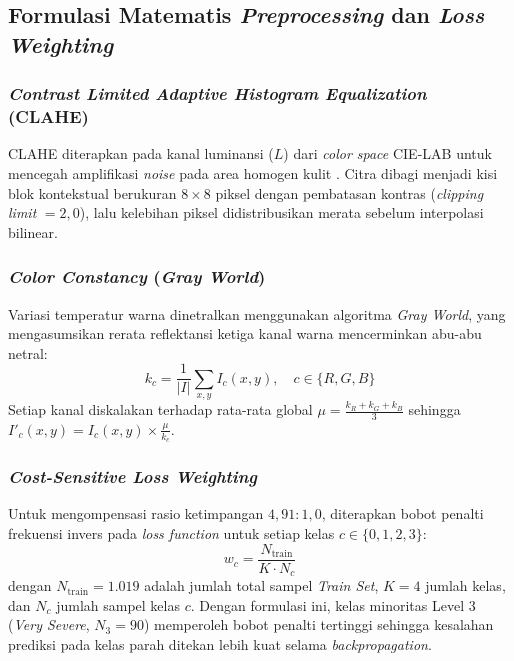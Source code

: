 \subsection{Formulasi Matematis \textit{Preprocessing} dan \textit{Loss Weighting}}

\subsubsection{\textit{Contrast Limited Adaptive Histogram Equalization} (CLAHE)}
CLAHE diterapkan pada kanal luminansi ($L$) dari \textit{color space} CIE-LAB untuk mencegah amplifikasi \textit{noise} pada area homogen kulit \cite{wang2023}. Citra dibagi menjadi kisi blok kontekstual berukuran $8\times8$ piksel dengan pembatasan kontras (\textit{clipping limit} $= 2,0$), lalu kelebihan piksel didistribusikan merata sebelum interpolasi bilinear.

\subsubsection{\textit{Color Constancy} (\textit{Gray World})}
Variasi temperatur warna dinetralkan menggunakan algoritma \textit{Gray World}, yang mengasumsikan rerata reflektansi ketiga kanal warna mencerminkan abu-abu netral:
\begin{equation}
    k_c = \frac{1}{|I|} \sum_{x,y} I_c(x,y), \quad c \in \{R, G, B\}
\end{equation}
Setiap kanal diskalakan terhadap rata-rata global $\mu = \frac{k_R + k_G + k_B}{3}$ sehingga $I'_c(x,y) = I_c(x,y) \times \frac{\mu}{k_c}$.

\subsubsection{\textit{Cost-Sensitive Loss Weighting}}
Untuk mengompensasi rasio ketimpangan $4,91 : 1,0$, diterapkan bobot penalti frekuensi invers pada \textit{loss function} untuk setiap kelas $c \in \{0, 1, 2, 3\}$:
\begin{equation}
    w_c = \frac{N_{\text{train}}}{K \cdot N_c}
\end{equation}
dengan $N_{\text{train}} = 1.019$ adalah jumlah total sampel \textit{Train Set}, $K = 4$ jumlah kelas, dan $N_c$ jumlah sampel kelas $c$. Dengan formulasi ini, kelas minoritas Level 3 (\textit{Very Severe}, $N_3 = 90$) memperoleh bobot penalti tertinggi sehingga kesalahan prediksi pada kelas parah ditekan lebih kuat selama \textit{backpropagation}.

